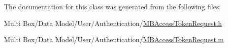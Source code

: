 The documentation for this class was generated from the following files\-:\begin{DoxyCompactItemize}
\item 
Multi Box/\-Data Model/\-User/\-Authentication/\hyperlink{_m_b_access_token_request_8h}{M\-B\-Access\-Token\-Request.\-h}\item 
Multi Box/\-Data Model/\-User/\-Authentication/\hyperlink{_m_b_access_token_request_8m}{M\-B\-Access\-Token\-Request.\-m}\end{DoxyCompactItemize}
